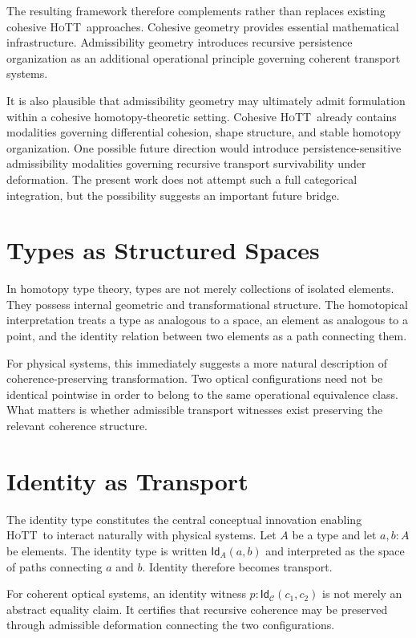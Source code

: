 \documentclass[11pt,openany]{book}
\theoremstyle{definition}
\theoremstyle{plain}
\newcommand{\idtype}{\mathsf{Id}}
\newcommand{\HoTT}{\textsc{HoTT}}
\begin{document}
The resulting framework therefore complements rather than replaces existing cohesive \HoTT\ approaches. Cohesive geometry provides essential mathematical infrastructure. Admissibility geometry introduces recursive persistence organization as an additional operational principle governing coherent transport systems.

It is also plausible that admissibility geometry may ultimately admit formulation within a cohesive homotopy-theoretic setting. Cohesive \HoTT\ already contains modalities governing differential cohesion, shape structure, and stable homotopy organization. One possible future direction would introduce persistence-sensitive admissibility modalities governing recursive transport survivability under deformation. The present work does not attempt such a full categorical integration, but the possibility suggests an important future bridge.

\section{Types as Structured Spaces}

In homotopy type theory, types are not merely collections of isolated elements. They possess internal geometric and transformational structure. The homotopical interpretation treats a type as analogous to a space, an element as analogous to a point, and the identity relation between two elements as a path connecting them.

For physical systems, this immediately suggests a more natural description of coherence-preserving transformation. Two optical configurations need not be identical pointwise in order to belong to the same operational equivalence class. What matters is whether admissible transport witnesses exist preserving the relevant coherence structure.

\section{Identity as Transport}

The identity type constitutes the central conceptual innovation enabling \HoTT\ to interact naturally with physical systems. Let $A$ be a type and let $a,b : A$ be elements. The identity type is written $\idtype_A(a,b)$ and interpreted as the space of paths connecting $a$ and $b$. Identity therefore becomes transport.

For coherent optical systems, an identity witness $p : \idtype_{\mathcal{C}}(c_1,c_2)$ is not merely an abstract equality claim. It certifies that recursive coherence may be preserved through admissible deformation connecting the two configurations.
\end{document}
